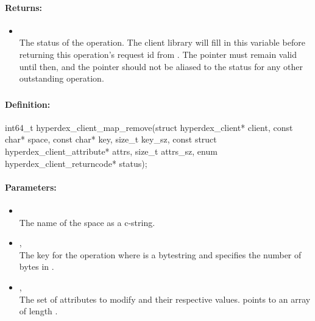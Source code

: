 \paragraph{Returns:}
\begin{itemize}[noitemsep]
\item {}\\
The status of the operation.  The client library will fill in this variable before returning this operation's request id from .  The pointer must remain valid until then, and the pointer should not be aliased to the status for any other outstanding operation.
\end{itemize}

\pagebreak
\subsubsection{}
\label{api:c:map_remove}


\paragraph{Definition:}
\begin{ccode}
int64_t hyperdex_client_map_remove(struct hyperdex_client* client,
        const char* space,
        const char* key, size_t key_sz,
        const struct hyperdex_client_attribute* attrs, size_t attrs_sz,
        enum hyperdex_client_returncode* status);
\end{ccode}

\paragraph{Parameters:}
\begin{itemize}[noitemsep]
\item {}\\
The name of the space as a c-string.
\item {}, \\
The key for the operation where  is a bytestring and  specifies the number of bytes in .
\item {}, \\
The set of attributes to modify and their respective values.   points to an array of length .
\end{itemize}

